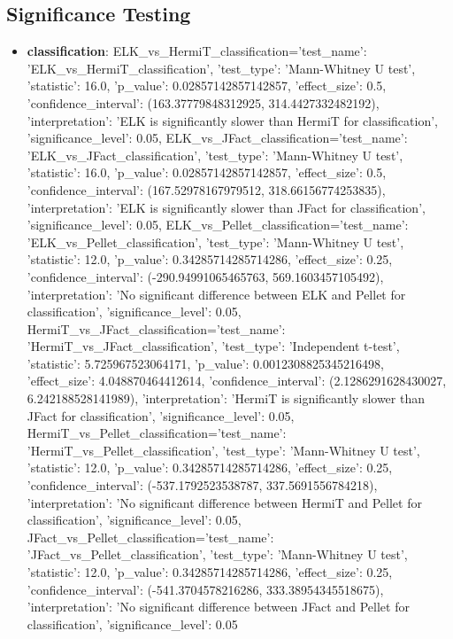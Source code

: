 \documentclass[11pt,a4paper]{{article}}
\begin{document}
\subsection{Significance Testing}
\begin{itemize}
    \item \textbf{classification}: ELK_vs_HermiT_classification={'test_name': 'ELK_vs_HermiT_classification', 'test_type': 'Mann-Whitney U test', 'statistic': 16.0, 'p_value': 0.02857142857142857, 'effect_size': 0.5, 'confidence_interval': (163.37779848312925, 314.4427332482192), 'interpretation': 'ELK is significantly slower than HermiT for classification', 'significance_level': 0.05}, ELK_vs_JFact_classification={'test_name': 'ELK_vs_JFact_classification', 'test_type': 'Mann-Whitney U test', 'statistic': 16.0, 'p_value': 0.02857142857142857, 'effect_size': 0.5, 'confidence_interval': (167.52978167979512, 318.66156774253835), 'interpretation': 'ELK is significantly slower than JFact for classification', 'significance_level': 0.05}, ELK_vs_Pellet_classification={'test_name': 'ELK_vs_Pellet_classification', 'test_type': 'Mann-Whitney U test', 'statistic': 12.0, 'p_value': 0.34285714285714286, 'effect_size': 0.25, 'confidence_interval': (-290.94991065465763, 569.1603457105492), 'interpretation': 'No significant difference between ELK and Pellet for classification', 'significance_level': 0.05}, HermiT_vs_JFact_classification={'test_name': 'HermiT_vs_JFact_classification', 'test_type': 'Independent t-test', 'statistic': 5.725967523064171, 'p_value': 0.0012308825345216498, 'effect_size': 4.048870464412614, 'confidence_interval': (2.1286291628430027, 6.242188528141989), 'interpretation': 'HermiT is significantly slower than JFact for classification', 'significance_level': 0.05}, HermiT_vs_Pellet_classification={'test_name': 'HermiT_vs_Pellet_classification', 'test_type': 'Mann-Whitney U test', 'statistic': 12.0, 'p_value': 0.34285714285714286, 'effect_size': 0.25, 'confidence_interval': (-537.1792523538787, 337.5691556784218), 'interpretation': 'No significant difference between HermiT and Pellet for classification', 'significance_level': 0.05}, JFact_vs_Pellet_classification={'test_name': 'JFact_vs_Pellet_classification', 'test_type': 'Mann-Whitney U test', 'statistic': 12.0, 'p_value': 0.34285714285714286, 'effect_size': 0.25, 'confidence_interval': (-541.3704578216286, 333.38954345518675), 'interpretation': 'No significant difference between JFact and Pellet for classification', 'significance_level': 0.05}

\end{itemize}
\end{document}
